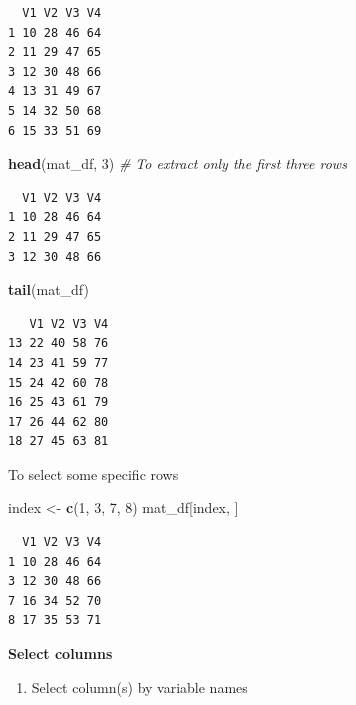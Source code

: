 \documentclass[]{book}
\newenvironment{Shaded}{\begin{snugshade}}{\end{snugshade}}
\newcommand{\CommentTok}[1]{\textcolor[rgb]{0.56,0.35,0.01}{\textit{#1}}}
\newcommand{\DecValTok}[1]{\textcolor[rgb]{0.00,0.00,0.81}{#1}}
\newcommand{\KeywordTok}[1]{\textcolor[rgb]{0.13,0.29,0.53}{\textbf{#1}}}
\newcommand{\NormalTok}[1]{#1}
\newcommand{\OperatorTok}[1]{\textcolor[rgb]{0.81,0.36,0.00}{\textbf{#1}}}
\newcommand{\StringTok}[1]{\textcolor[rgb]{0.31,0.60,0.02}{#1}}
\providecommand{\tightlist}{%
  \setlength{\itemsep}{0pt}\setlength{\parskip}{0pt}}
\begin{document}
\begin{verbatim}
  V1 V2 V3 V4
1 10 28 46 64
2 11 29 47 65
3 12 30 48 66
4 13 31 49 67
5 14 32 50 68
6 15 33 51 69
\end{verbatim}

\begin{Shaded}
\begin{Highlighting}[]
\KeywordTok{head}\NormalTok{(mat_df, }\DecValTok{3}\NormalTok{) }\CommentTok{# To extract only the first three rows }
\end{Highlighting}
\end{Shaded}

\begin{verbatim}
  V1 V2 V3 V4
1 10 28 46 64
2 11 29 47 65
3 12 30 48 66
\end{verbatim}

\begin{Shaded}
\begin{Highlighting}[]
\KeywordTok{tail}\NormalTok{(mat_df)}
\end{Highlighting}
\end{Shaded}

\begin{verbatim}
   V1 V2 V3 V4
13 22 40 58 76
14 23 41 59 77
15 24 42 60 78
16 25 43 61 79
17 26 44 62 80
18 27 45 63 81
\end{verbatim}

To select some specific rows

\begin{Shaded}
\begin{Highlighting}[]
\NormalTok{index <-}\StringTok{ }\KeywordTok{c}\NormalTok{(}\DecValTok{1}\NormalTok{, }\DecValTok{3}\NormalTok{, }\DecValTok{7}\NormalTok{, }\DecValTok{8}\NormalTok{)}
\NormalTok{mat_df[index, ]}
\end{Highlighting}
\end{Shaded}

\begin{verbatim}
  V1 V2 V3 V4
1 10 28 46 64
3 12 30 48 66
7 16 34 52 70
8 17 35 53 71
\end{verbatim}

\textbf{Select columns}

\begin{enumerate}
\def\labelenumi{\arabic{enumi}.}
\tightlist
\item
  Select column(s) by variable names
\end{enumerate}

\begin{Shaded}
\end{Shaded}
\end{document}
